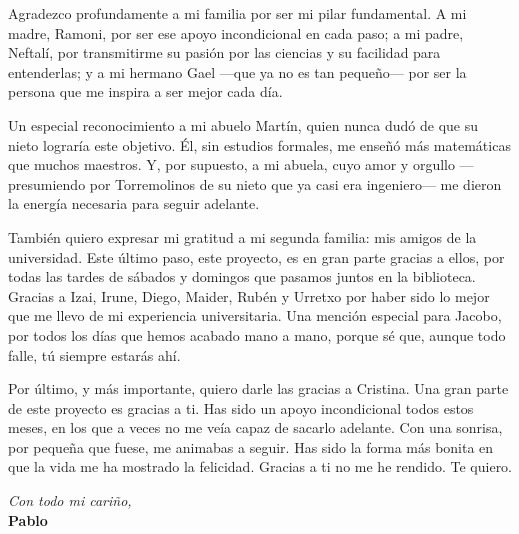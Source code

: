 \documentclass[a4paper,11pt,twoside]{report}
\begin{document}
\vspace{0.8cm}

Agradezco profundamente a mi familia por ser mi pilar fundamental. A mi madre, Ramoni, por ser ese apoyo incondicional en cada paso; a mi padre, Neftalí, por transmitirme su pasión por las ciencias y su facilidad para entenderlas; y a mi hermano Gael ---que ya no es tan pequeño--- por ser la persona que me inspira a ser mejor cada día.

\vspace{0.2cm}

Un especial reconocimiento a mi abuelo Martín, quien nunca dudó de que su nieto lograría este objetivo. Él, sin estudios formales, me enseñó más matemáticas que muchos maestros. Y, por supuesto, a mi abuela, cuyo amor y orgullo ---presumiendo por Torremolinos de su nieto que ya casi era ingeniero--- me dieron la energía necesaria para seguir adelante.

\vspace{0.8cm}

También quiero expresar mi gratitud a mi segunda familia: mis amigos de la universidad. Este último paso, este proyecto, es en gran parte gracias a ellos, por todas las tardes de sábados y domingos que pasamos juntos en la biblioteca. Gracias a Izai, Irune, Diego, Maider, Rubén y Urretxo por haber sido lo mejor que me llevo de mi experiencia universitaria.  Una mención especial para Jacobo, por todos los días que hemos acabado mano a mano, porque sé que, aunque todo falle, tú siempre estarás ahí.

\vspace{0.8cm}

Por último, y más importante, quiero darle las gracias a Cristina. Una gran parte de este proyecto es gracias a ti. Has sido un apoyo incondicional todos estos meses, en los que a veces no me veía capaz de sacarlo adelante. Con una sonrisa, por pequeña que fuese, me animabas a seguir. Has sido la forma más bonita en que la vida me ha mostrado la felicidad. Gracias a ti no me he rendido. Te quiero.

\vspace{1cm}

\begin{center}
  \textit{Con todo mi cariño,} \\
  \textbf{Pablo}
\end{center}


\clearpage
\tableofcontents    %
\clearpage
\listoffigures      %
\end{document}
